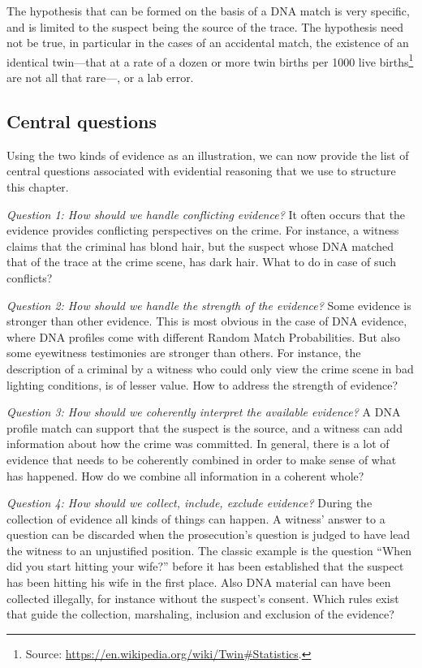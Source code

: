 \documentclass[10pt]{article}
\begin{document}
The hypothesis that can be formed on the basis of a DNA match is very specific, and is limited to the suspect being the source of the trace. The hypothesis need not be true, in particular in the cases of an accidental match, the existence of an identical twin---that at a rate of a dozen or more twin births per 1000 live births\footnote{Source: 
\url{https://en.wikipedia.org/wiki/Twin\#Statistics}.} are not all that rare---, or a lab error. 

\subsection{Central questions}

Using the two kinds of evidence as an illustration, we can now provide the list of central questions associated with evidential reasoning that we use to structure this chapter.

\textit{Question 1:	How should we handle conflicting evidence?}
It often occurs that the evidence provides conflicting perspectives on the crime. For instance, a witness claims that the criminal has blond hair, but the suspect whose DNA matched that of the trace at the crime scene, has dark hair. What to do in case of such conflicts?

\textit{Question 2:	How should we handle the strength of the evidence?}
Some evidence is stronger than other evidence. This is most obvious in the case of DNA evidence, where DNA profiles come with different Random Match Probabilities. But also some eyewitness testimonies are stronger than others. For instance, the description of a criminal by a witness who could only view the crime scene in bad lighting conditions, is of lesser value. How to address the strength of evidence?

\textit{Question 3:	How should we coherently interpret the available evidence?}
A DNA profile match can support that the suspect is the source, and a witness can add information about how the crime was committed. In general, there is a lot of evidence that needs to be coherently combined in order to make sense of what has happened. How do we combine all information in a coherent whole?

\textit{Question 4:	How should we collect, include, exclude evidence?}
During the collection of evidence all kinds of things can happen. A witness' answer to a question can be discarded when the prosecution's question is judged to have lead the witness to an unjustified position. The classic example is the question ``When did you start hitting your wife?'' before it has been established that the suspect has been hitting his wife in the first place. Also DNA material can have been collected illegally, for instance without the suspect's consent. Which rules exist that guide the collection, marshaling, inclusion and exclusion of the evidence?
\end{document}
